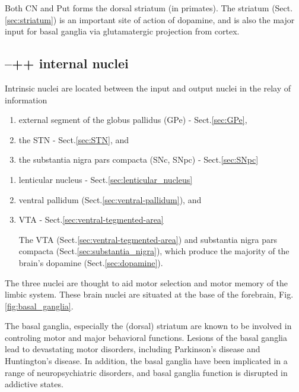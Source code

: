 Both CN and Put forms the dorsal striatum (in primates). The striatum
(Sect.\ref{sec:striatum}) is an important site of action of dopamine, and is
also the major input for basal ganglia via glutamatergic projection from cortex.
  



\subsection{--++ internal nuclei}
\label{sec:basal-ganglia-internal-nuclei}

Intrinsic nuclei are located between the input and output nuclei in the relay of
information
\begin{enumerate}

  \item  external segment of the globus pallidus (GPe) - Sect.\ref{sec:GPe}, 

  \item the STN - Sect.\ref{sec:STN}, and 
  
  \item the substantia nigra pars compacta (SNc, SNpc) - Sect.\ref{sec:SNpc}
\end{enumerate}


\begin{enumerate}
  \item lenticular nucleus - Sect.\ref{sec:lenticular_nucleus}
  
  \item ventral pallidum (Sect.\ref{sec:ventral-pallidum}), and 
  
  \item VTA - Sect.\ref{sec:ventral-tegmented-area}

The VTA (Sect.\ref{sec:ventral-tegmented-area}) and substantia nigra pars
compacta (Sect.\ref{sec:substantia_nigra}), which produce the majority of the
brain's dopamine (Sect.\ref{sec:dopamine}). 
\end{enumerate}
The three nuclei are  thought to aid motor selection and motor memory of the
limbic system. These brain nuclei are situated at the base of the forebrain,
Fig.\ref{fig:basal_ganglia}.


The basal ganglia, especially the (dorsal) striatum are known to be involved in
controling motor and major behavioral functions. Lesions of the basal ganglia
lead to devastating motor disorders, including Parkinson's disease and
Huntington's disease. In addition, the basal ganglia have been implicated in a
range of neuropsychiatric disorders, and basal ganglia function is disrupted in
addictive states.

